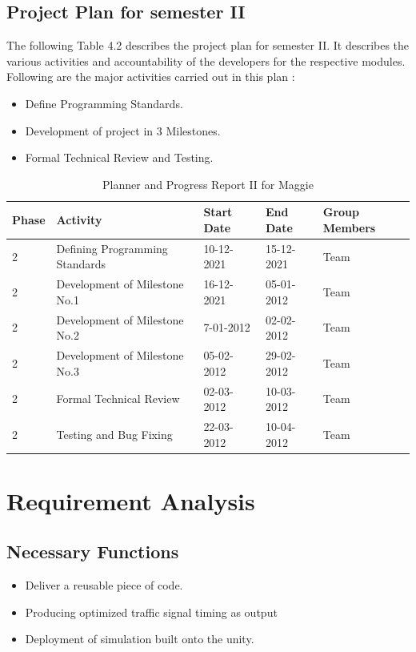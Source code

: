 \documentclass[openany,12pt]{report}
\begin{document}
	\subsection{Project Plan for semester II}
	
		\hspace*{0.5 in}The following Table 4.2 describes the project plan for semester II. It describes the various activities and accountability of the developers for the respective modules. Following are the major activities carried out in this plan :
		\begin{itemize}
			\item{Define Programming Standards.}
			\item{Development of project in 3 Milestones.}
			\item{Formal Technical Review and Testing.}
		\end{itemize}
		\newpage
		\begin{table} [htb]
			\begin{tabular}{| p{1.2 cm}| p{5 cm}| p{2.5 cm}| p{2.5 cm}| p{3 cm}| }\hline
				\textbf{Phase}	&\textbf{Activity}	&\textbf{Start Date}	&\textbf{End Date} &\textbf{Group Members}\\\hline\hline
				2 &Defining Programming Standards	&10-12-2021 	&15-12-2021 &Team \\\hline
				2 &Development of Milestone No.1 &16-12-2021 &05-01-2012 &Team\\\hline
				2 &Development of Milestone No.2 &7-01-2012 &02-02-2012 &Team\\\hline
				2 &Development of Milestone No.3 &05-02-2012 &29-02-2012 & Team \\\hline
				2 &Formal Technical Review &02-03-2012 &10-03-2012 &Team \\\hline
				2 &Testing and Bug Fixing  &22-03-2012 &10-04-2012 &Team\\\hline
				
			\end{tabular}
			\caption{Planner and Progress Report II for Maggie}
			\label{tab:nnwork}
		\end{table}
	
	
	
	\section{Requirement Analysis}
	
	\subsection{Necessary Functions}
	\begin{itemize}
		\item{Deliver a reusable piece of code.}
		\item{Producing optimized traffic signal timing as output}
		\item{Deployment of simulation built onto the unity.}
	\end{itemize}
	
\end{document}
